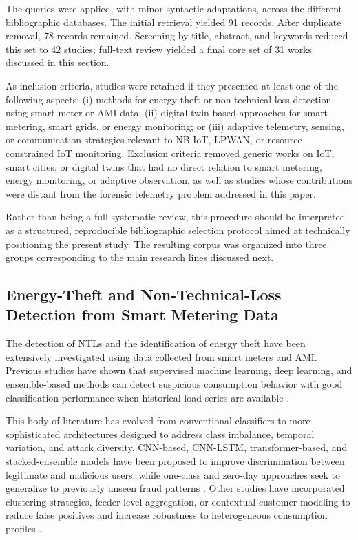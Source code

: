 \documentclass[journal]{IEEEtran}
\begin{document}
The queries were applied, with minor syntactic adaptations, across the different bibliographic databases. The initial retrieval yielded 91 records. After duplicate removal, 78 records remained. Screening by title, abstract, and keywords reduced this set to 42 studies; full-text review yielded a final core set of 31 works discussed in this section.

As inclusion criteria, studies were retained if they presented at least one of the following aspects: (i) methods for energy-theft or non-technical-loss detection using smart meter or AMI data; (ii) digital-twin-based approaches for smart metering, smart grids, or energy monitoring; or (iii) adaptive telemetry, sensing, or communication strategies relevant to NB-IoT, LPWAN, or resource-constrained IoT monitoring. Exclusion criteria removed generic works on IoT, smart cities, or digital twins that had no direct relation to smart metering, energy monitoring, or adaptive observation, as well as studies whose contributions were distant from the forensic telemetry problem addressed in this paper.

Rather than being a full systematic review, this procedure should be interpreted as a structured, reproducible bibliographic selection protocol aimed at technically positioning the present study. The resulting corpus was organized into three groups corresponding to the main research lines discussed next.

\subsection{Energy-Theft and Non-Technical-Loss Detection from Smart Metering Data}
The detection of NTLs and the identification of energy theft have been extensively investigated using data collected from smart meters and AMI. Previous studies have shown that supervised machine learning, deep learning, and ensemble-based methods can detect suspicious consumption behavior with good classification performance when historical load series are available \cite{b1, b2, b3, b4, b5, b6}.

This body of literature has evolved from conventional classifiers to more sophisticated architectures designed to address class imbalance, temporal variation, and attack diversity. CNN-based, CNN-LSTM, transformer-based, and stacked-ensemble models have been proposed to improve discrimination between legitimate and malicious users, while one-class and zero-day approaches seek to generalize to previously unseen fraud patterns \cite{b7, b8, b9, b10, b11, b12}. Other studies have incorporated clustering strategies, feeder-level aggregation, or contextual customer modeling to reduce false positives and increase robustness to heterogeneous consumption profiles \cite{b13, b14}.
\end{document}
